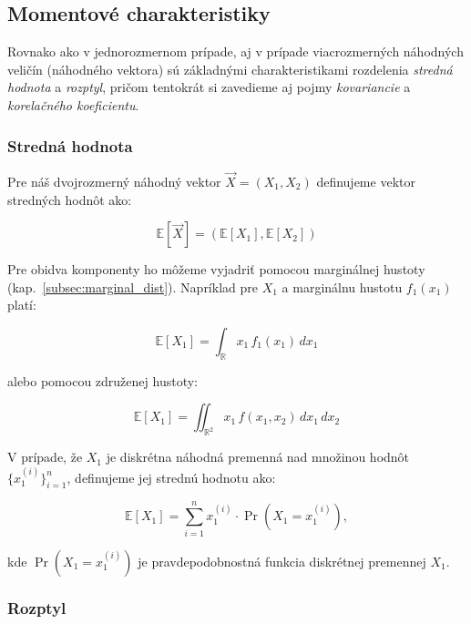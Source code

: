 \subsection{Momentové charakteristiky}\label{joint_moments}

Rovnako ako v jednorozmernom prípade, aj v prípade viacrozmerných náhodných veličín (náhodného vektora) sú základnými charakteristikami rozdelenia \textit{stredná hodnota} a \textit{rozptyl}, pričom tentokrát si zavedieme aj pojmy \textit{kovariancie} a \textit{korelačného koeficientu}.

\subsubsection{Stredná hodnota}\label{subsubsec:joint_mean}

Pre náš dvojrozmerný náhodný vektor \(\vec{X} = (X_1, X_2)\) definujeme vektor stredných hodnôt ako:

\begin{equation}
\mathbb{E}[\vec{X}] = \left( \mathbb{E}[X_1], \mathbb{E}[X_2] \right)
\end{equation}

Pre obidva komponenty ho môžeme vyjadriť pomocou marginálnej hustoty (kap.~\ref{subsec:marginal_dist}). Napríklad pre \(X_1\) a marginálnu hustotu \(f_1(x_1)\) platí:

\begin{equation}
\mathbb{E}[X_1] = \int_{\mathbb{R}} x_1 \, f_1(x_1) \, dx_1
\end{equation}

alebo pomocou združenej hustoty:

\begin{equation}
\mathbb{E}[X_1] = \iint_{\mathbb{R}^2} x_1 \, f(x_1, x_2) \, dx_1 \, dx_2
\end{equation}

V prípade, že \(X_1\) je diskrétna náhodná premenná nad množinou hodnôt \(\{x_1^{(i)}\}_{i=1}^{n}\), definujeme jej strednú hodnotu ako:

\begin{equation}
\mathbb{E}[X_1] = \sum_{i=1}^{n} x_1^{(i)} \cdot \Pr(X_1 = x_1^{(i)}),
\end{equation}

kde \(\Pr(X_1 = x_1^{(i)})\) je pravdepodobnostná funkcia diskrétnej premennej \(X_1\).

\subsubsection{Rozptyl}\label{subsubsec:joint_variance}


